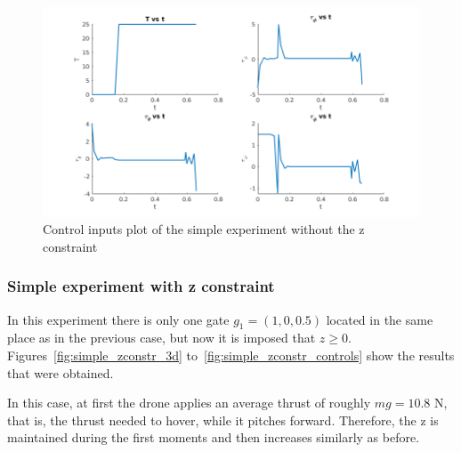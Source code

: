 \documentclass[letterpaper, 10 pt, conference]{ieeeconf}  %
\begin{document}
\begin{figure}[!htpb]
	\centering
	\includegraphics[width=1.0\linewidth]{Images/simple_zfree/controls.png}
	\caption{Control inputs plot of the simple experiment without the z constraint}
	\label{fig:simple_zfree_controls}
\end{figure}

\subsubsection{Simple experiment with z constraint}

In this experiment there is only one gate $g_1=(1, 0, 0.5)$ located in the same place as in the previous case, but now it is imposed that $ z \ge 0$. Figures~\ref{fig:simple_zconstr_3d} to~\ref{fig:simple_zconstr_controls} show the results that were obtained.

In this case, at first the drone applies an average thrust of roughly $mg = 10.8$ N, that is, the thrust needed to hover, while it pitches forward. Therefore, the z is maintained during the first moments and then increases similarly as before. %
\end{document}
